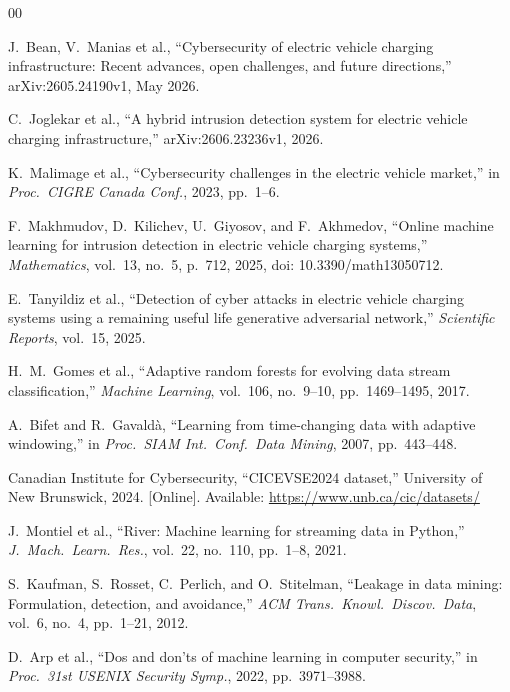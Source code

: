 \documentclass[conference]{IEEEtran}
\begin{document}
\begin{thebibliography}{00}

 J.\ Bean, V.\ Manias et al., ``Cybersecurity of electric vehicle charging infrastructure: Recent advances, open challenges, and future directions,'' arXiv:2605.24190v1, May 2026.

 C.\ Joglekar et al., ``A hybrid intrusion detection system for electric vehicle charging infrastructure,'' arXiv:2606.23236v1, 2026.

 K.\ Malimage et al., ``Cybersecurity challenges in the electric vehicle market,'' in \emph{Proc.\ CIGRE Canada Conf.}, 2023, pp.\ 1--6.

 F.\ Makhmudov, D.\ Kilichev, U.\ Giyosov, and F.\ Akhmedov, ``Online machine learning for intrusion detection in electric vehicle charging systems,'' \emph{Mathematics}, vol.\ 13, no.\ 5, p.\ 712, 2025, doi: 10.3390/math13050712.

 E.\ Tanyildiz et al., ``Detection of cyber attacks in electric vehicle charging systems using a remaining useful life generative adversarial network,'' \emph{Scientific Reports}, vol.\ 15, 2025.

 H.\ M.\ Gomes et al., ``Adaptive random forests for evolving data stream classification,'' \emph{Machine Learning}, vol.\ 106, no.\ 9--10, pp.\ 1469--1495, 2017.

 A.\ Bifet and R.\ Gavald\`{a}, ``Learning from time-changing data with adaptive windowing,'' in \emph{Proc.\ SIAM Int.\ Conf.\ Data Mining}, 2007, pp.\ 443--448.

 Canadian Institute for Cybersecurity, ``CICEVSE2024 dataset,'' University of New Brunswick, 2024. [Online]. Available: \url{https://www.unb.ca/cic/datasets/}

 J.\ Montiel et al., ``River: Machine learning for streaming data in Python,'' \emph{J.\ Mach.\ Learn.\ Res.}, vol.\ 22, no.\ 110, pp.\ 1--8, 2021.

 S.\ Kaufman, S.\ Rosset, C.\ Perlich, and O.\ Stitelman, ``Leakage in data mining: Formulation, detection, and avoidance,'' \emph{ACM Trans.\ Knowl.\ Discov.\ Data}, vol.\ 6, no.\ 4, pp.\ 1--21, 2012.

 D.\ Arp et al., ``Dos and don'ts of machine learning in computer security,'' in \emph{Proc.\ 31st USENIX Security Symp.}, 2022, pp.\ 3971--3988.


\end{thebibliography}
\end{document}
